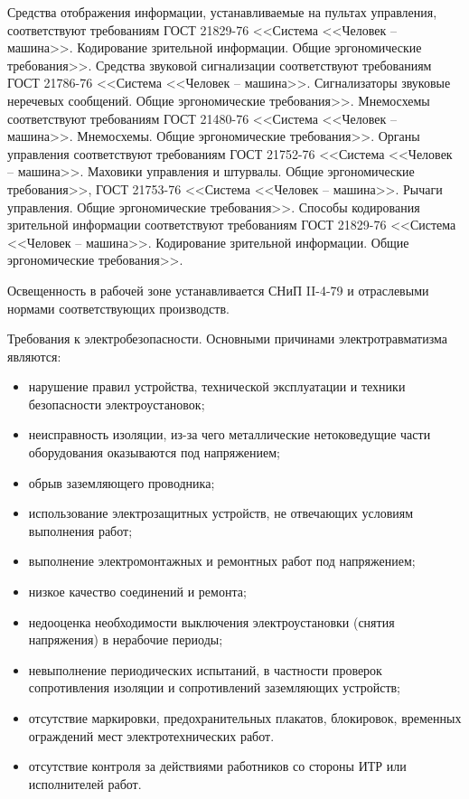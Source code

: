         Средства отображения информации, устанавливаемые на пультах управления,
        соответствуют требованиям ГОСТ 21829-76 <<Система <<Человек – машина>>.
        Кодирование зрительной информации. Общие эргономические требования>>.
        Средства звуковой сигнализации соответствуют требованиям ГОСТ 21786-76
        <<Система <<Человек – машина>>. Сигнализаторы звуковые неречевых
        сообщений. Общие эргономические требования>>.  Мнемосхемы соответствуют
        требованиям ГОСТ 21480-76 <<Система <<Человек – машина>>. Мнемосхемы.
        Общие эргономические требования>>. Органы управления соответствуют
        требованиям ГОСТ 21752-76 <<Система <<Человек – машина>>. Маховики
        управления и штурвалы. Общие эргономические требования>>, ГОСТ 21753-76
        <<Система <<Человек – машина>>. Рычаги управления.  Общие
        эргономические требования>>. Способы кодирования зрительной информации
        соответствуют требованиям ГОСТ 21829-76 <<Система <<Человек – машина>>.
        Кодирование зрительной информации. Общие эргономические требования>>.

        Освещенность в рабочей зоне устанавливается СНиП II-4-79 и отраслевыми
        нормами соответствующих производств.

        Требования к электробезопасности.
        Основными причинами электротравматизма являются:
        \begin{itemize}
            \item нарушение  правил устройства,  технической  эксплуатации и
                техники безопасности электроустановок;
            \item неисправность изоляции, из-за чего металлические
                нетоковедущие части оборудования оказываются под напряжением;
            \item обрыв заземляющего проводника;
            \item использование электрозащитных устройств, не отвечающих
                условиям выполнения работ;
            \item выполнение электромонтажных и ремонтных работ под напряжением;
            \item низкое качество соединений и ремонта;
            \item недооценка  необходимости  выключения электроустановки
                (снятия напряжения) в нерабочие периоды;
            \item невыполнение периодических испытаний, в частности проверок
                сопротивления изоляции и сопротивлений заземляющих устройств;
            \item отсутствие маркировки, предохранительных плакатов,
                блокировок, временных ограждений мест электротехнических работ.
            \item отсутствие контроля за действиями работников со стороны ИТР
                или исполнителей работ.
        \end{itemize}

